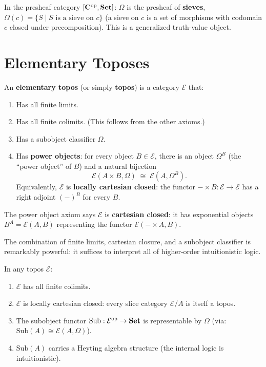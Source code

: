 \begin{example}
In the presheaf category $[\mathbf{C}^{\mathrm{op}}, \mathbf{Set}]$: $\Omega$ is the presheaf of \textbf{sieves}, $\Omega(c) = \{S \mid S \text{ is a sieve on } c\}$ (a sieve on $c$ is a set of morphisms with codomain $c$ closed under precomposition). This is a generalized truth-value object.
\end{example}

\section{Elementary Toposes}

\begin{definition}
An \textbf{elementary topos} (or simply \textbf{topos}) is a category $\mathcal{E}$ that:
\begin{enumerate}
  \item Has all finite limits.
  \item Has all finite colimits. (This follows from the other axioms.)
  \item Has a subobject classifier $\Omega$.
  \item Has \textbf{power objects}: for every object $B \in \mathcal{E}$, there is an object $\Omega^B$ (the ``power object'' of $B$) and a natural bijection
  \[
    \mathcal{E}(A \times B, \Omega) \;\cong\; \mathcal{E}(A, \Omega^B).
  \]
  Equivalently, $\mathcal{E}$ is \textbf{locally cartesian closed}: the functor $- \times B: \mathcal{E} \to \mathcal{E}$ has a right adjoint $(-)^B$ for every $B$.
\end{enumerate}
\end{definition}

\begin{remark}
The power object axiom says $\mathcal{E}$ is \textbf{cartesian closed}: it has exponential objects $B^A = \mathcal{E}(A, B)$ representing the functor $\mathcal{E}(- \times A, B)$.

The combination of finite limits, cartesian closure, and a subobject classifier is remarkably powerful: it suffices to interpret all of higher-order intuitionistic logic.
\end{remark}

\begin{theorem}
In any topos $\mathcal{E}$:
\begin{enumerate}
  \item $\mathcal{E}$ has all finite colimits.
  \item $\mathcal{E}$ is locally cartesian closed: every slice category $\mathcal{E}/A$ is itself a topos.
  \item The subobject functor $\mathrm{Sub}: \mathcal{E}^{\mathrm{op}} \to \mathbf{Set}$ is representable by $\Omega$ (via: $\mathrm{Sub}(A) \cong \mathcal{E}(A, \Omega)$).
  \item $\mathrm{Sub}(A)$ carries a Heyting algebra structure (the internal logic is intuitionistic).
\end{enumerate}
\end{theorem}

